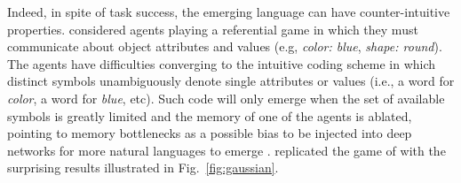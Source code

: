 Indeed, in spite of task success, the emerging language can have
counter-intuitive properties.  considered
agents playing a referential game in which they must communicate about
object attributes and values (e.g, \emph{color: blue}, \emph{shape:
  round}). The agents have difficulties converging to the intuitive
coding scheme in which distinct symbols unambiguously denote single
attributes or values (i.e., a word for \emph{color}, a word for
\emph{blue}, etc). Such code will only emerge when the set of
available symbols is greatly limited and the memory of one of the
agents is ablated, pointing to memory bottlenecks as a possible
bias to be injected into deep networks for more natural languages to
emerge \cite<see also>{Resnick:etal:2020}.  replicated
the game of  with the surprising results
illustrated in Fig.~\ref{fig:gaussian}.

